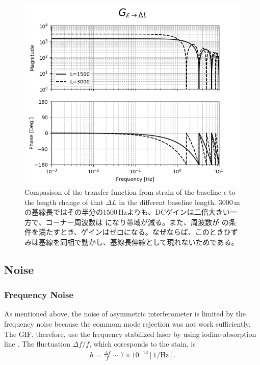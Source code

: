 \begin{figure}[p]
  \begin{center}
    \includegraphics[width=13.0cm]{./img_chap4/img412.png}
    \caption{Compasison of the transfer function from strain of the baseline $\epsilon$ to the length change of that $\Delta{L}$ in the different baseline length. $3000\,\mathrm{m}$ の基線長ではその半分の$1500\,\mathrm{Hz}$よりも、DCゲインは二倍大きい一方で、コーナー周波数は \color{red}{A} になり帯域が減る。また、周波数が \color{red}{B} の条件を満たすとき、ゲインはゼロになる。なぜならば、このときひずみは基線を同相で動かし、基線長伸縮として現れないためである。}\label{img:img411_a}
  \end{center}
\end{figure}

\subsection{Noise}
\subsubsection{Frequency Noise} \label{sec:123}
As mentioned above, the noise of asymmetric interferometer is limited by the frequency noise because the commom mode rejection was not work sufficiently. The GIF, therefore, use the frequency stabilized laser by using iodine-absorption line \cite{araya2017design}. The fluctuation $\Delta{f}/f$, which coresponds to the stain, is
\begin{eqnarray}
  h = \frac{\Delta{f}}{f} \sim 7\times10^{-13} [\mathrm{1/\mathrm{Hz}}].
\end{eqnarray}

